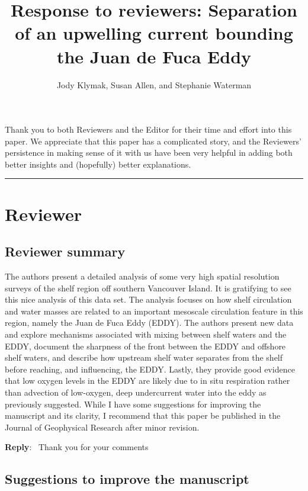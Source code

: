 \documentclass[11pt]{article}
\title{Response to reviewers: Separation of an upwelling current bounding the Juan de Fuca Eddy}
\author{Jody Klymak, Susan Allen, and Stephanie Waterman}
\newcounter{reviewer}
\newcounter{point}[reviewer]
\newcommand{\reviewersection}{\stepcounter{reviewer} \bigskip \hrule
                  \section*{Reviewer \thereviewer}}
\newenvironment{reply}
   {\medskip \noindent \begin{sf}\textbf{Reply}:\  }
   {\medskip \end{sf}}
\begin{document}
\lstset{language=TeX}

\maketitle

\section*{}
Thank you to both Reviewers and the Editor for their time and effort into this paper.  We appreciate that this paper has a complicated story, and the Reviewers' persistence in making sense of it with us have been very helpful in adding both better insights and (hopefully) better explanations.

\reviewersection

\subsection*{Reviewer summary}
The authors present a detailed analysis of some very high spatial resolution surveys of the shelf region off southern Vancouver Island. It is gratifying to see this nice analysis of this data set. The analysis focuses on how shelf circulation and water masses are related to an important mesoscale circulation feature in this region, namely the Juan de Fuca Eddy (EDDY). The authors present new data and explore mechanisms associated with mixing between shelf waters and the EDDY, document the sharpness of the front between the EDDY and offshore shelf waters, and describe how upstream shelf water separates from the shelf before reaching, and influencing, the EDDY. Lastly, they provide good evidence that low oxygen levels in the EDDY are likely due to in situ respiration rather than advection of low-oxygen, deep undercurrent water into the eddy as previously suggested. While I have some suggestions for improving the manuscript and its clarity, I recommend that this paper be published in the Journal of Geophysical Research after minor revision.

\begin{reply}
    Thank you for your comments
\end{reply}

\subsection*{Suggestions to improve the manuscript}
\end{document}
